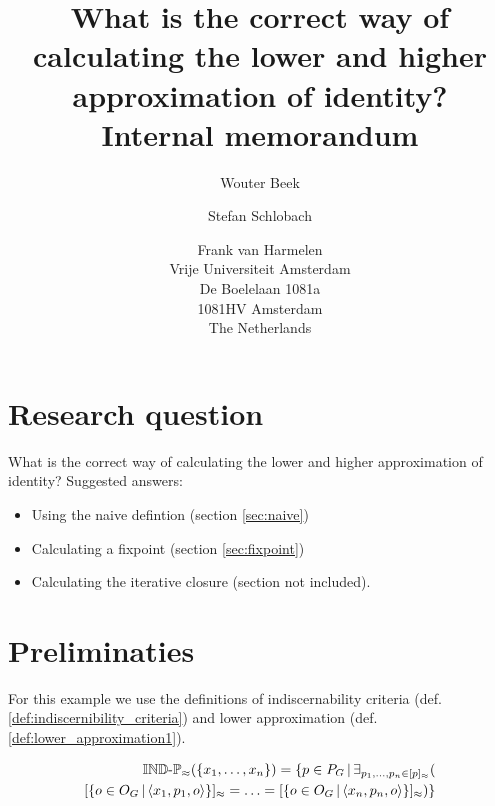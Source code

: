 \documentclass[a4paper]{article}
\begin{document}
\title{
  What is the correct way of calculating
  the lower and higher approximation of identity?\\
  Internal memorandum
}
\author{Wouter Beek \and Stefan Schlobach \and Frank van Harmelen\\
Vrije Universiteit Amsterdam\\
De Boelelaan 1081a\\
1081HV Amsterdam\\
The Netherlands}
\maketitle

\section{Research question}

What is the correct way of calculating
  the lower and higher approximation of identity?
Suggested answers:
  \begin{itemize}
    \item Using the naive defintion (section \ref{sec:naive})
    \item Calculating a fixpoint (section \ref{sec:fixpoint})
    \item Calculating the iterative closure (section not included).
  \end{itemize}

\section{Preliminaties}
\label{sec:preliminaries}

For this example we use the definitions of
  indiscernability criteria (def. \ref{def:indiscernibility_criteria})
  and lower approximation (def. \ref{def:lower_approximation1}).

\begin{definition}
\label{def:indiscernibility_criteria}
\begin{align}
  \indp_{\approx}(\setrange{x_1}{x_n})
=
  \setdef{
    p \in P_G
  }{
    \exists_{\range{p_1}{p_n} \in \equivset{p}}(\\
        \equivset{
          \setdef{
            o \in O_G
          }{
            \triple{x_1}{p_1}{o}
          }
        }
      =
        \ldots
      =
        \equivset{
          \setdef{
            o \in O_G
          }{
            \triple{x_n}{p_n}{o}
          }
        }
    )
  }\nonumber
\end{align}
\end{definition}
\end{document}
